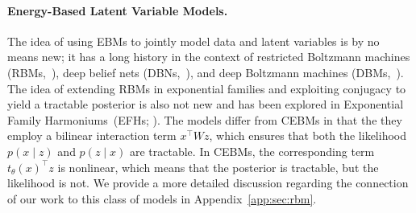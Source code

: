 \documentclass{article}
\begin{document}
\paragraph{Energy-Based Latent Variable Models.} The idea of using EBMs to jointly model data and latent variables is by no means new; it has a long history in the context of restricted Boltzmann machines (RBMs,~\citep{smolensky1986information,hinton2002training}), deep belief nets (DBNs,~\cite{hinton2006fast}), and deep Boltzmann machines (DBMs,~\citep{salakhutdinov2009deep}). The idea of extending RBMs in exponential families and exploiting conjugacy to yield a tractable posterior is also not new and has been explored in Exponential Family Harmoniums~(EFHs; \citep{welling2005exponential}). The models differ from CEBMs in that the they employ a bilinear interaction term $x^\top W z$, which ensures that both the likelihood $p(x \mid z)$ and $p(z \mid x)$ are tractable. In CEBMs, the corresponding term $t_\theta(x)^\top z$ is nonlinear, which means that the posterior is tractable, but the likelihood is not. 
We provide a more detailed discussion regarding the connection of our work to this class of models in Appendix~\ref{app:sec:rbm}.  




\end{document}
